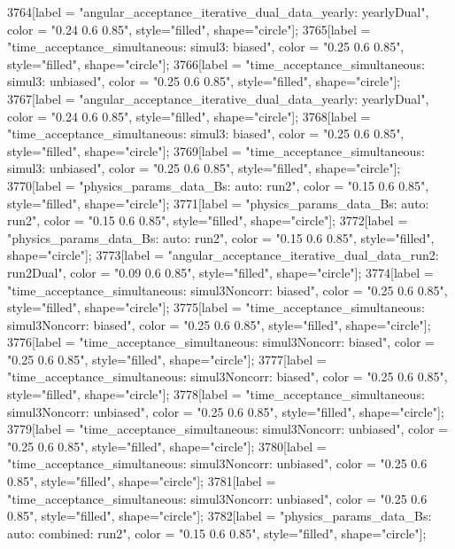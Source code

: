 {	3764[label = "angular_acceptance_iterative_dual_data_yearly\nangacc: yearlyDual", color = "0.24 0.6 0.85", style="filled", shape="circle"];
	3765[label = "time_acceptance_simultaneous\ntimeacc: simul3\ntrigger: biased", color = "0.25 0.6 0.85", style="filled", shape="circle"];
	3766[label = "time_acceptance_simultaneous\ntimeacc: simul3\ntrigger: unbiased", color = "0.25 0.6 0.85", style="filled", shape="circle"];
	3767[label = "angular_acceptance_iterative_dual_data_yearly\nangacc: yearlyDual", color = "0.24 0.6 0.85", style="filled", shape="circle"];
	3768[label = "time_acceptance_simultaneous\ntimeacc: simul3\ntrigger: biased", color = "0.25 0.6 0.85", style="filled", shape="circle"];
	3769[label = "time_acceptance_simultaneous\ntimeacc: simul3\ntrigger: unbiased", color = "0.25 0.6 0.85", style="filled", shape="circle"];
	3770[label = "physics_params_data_Bs\nfit: auto\nyear: run2", color = "0.15 0.6 0.85", style="filled", shape="circle"];
	3771[label = "physics_params_data_Bs\nfit: auto\nyear: run2", color = "0.15 0.6 0.85", style="filled", shape="circle"];
	3772[label = "physics_params_data_Bs\nfit: auto\nyear: run2", color = "0.15 0.6 0.85", style="filled", shape="circle"];
	3773[label = "angular_acceptance_iterative_dual_data_run2\nangacc: run2Dual", color = "0.09 0.6 0.85", style="filled", shape="circle"];
	3774[label = "time_acceptance_simultaneous\ntimeacc: simul3Noncorr\ntrigger: biased", color = "0.25 0.6 0.85", style="filled", shape="circle"];
	3775[label = "time_acceptance_simultaneous\ntimeacc: simul3Noncorr\ntrigger: biased", color = "0.25 0.6 0.85", style="filled", shape="circle"];
	3776[label = "time_acceptance_simultaneous\ntimeacc: simul3Noncorr\ntrigger: biased", color = "0.25 0.6 0.85", style="filled", shape="circle"];
	3777[label = "time_acceptance_simultaneous\ntimeacc: simul3Noncorr\ntrigger: biased", color = "0.25 0.6 0.85", style="filled", shape="circle"];
	3778[label = "time_acceptance_simultaneous\ntimeacc: simul3Noncorr\ntrigger: unbiased", color = "0.25 0.6 0.85", style="filled", shape="circle"];
	3779[label = "time_acceptance_simultaneous\ntimeacc: simul3Noncorr\ntrigger: unbiased", color = "0.25 0.6 0.85", style="filled", shape="circle"];
	3780[label = "time_acceptance_simultaneous\ntimeacc: simul3Noncorr\ntrigger: unbiased", color = "0.25 0.6 0.85", style="filled", shape="circle"];
	3781[label = "time_acceptance_simultaneous\ntimeacc: simul3Noncorr\ntrigger: unbiased", color = "0.25 0.6 0.85", style="filled", shape="circle"];
	3782[label = "physics_params_data_Bs\nfit: auto\ntrigger: combined\nyear: run2", color = "0.15 0.6 0.85", style="filled", shape="circle"];
}
